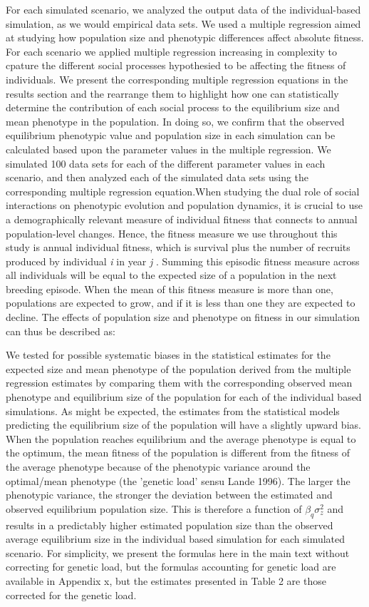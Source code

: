 \documentclass{article}
\begin{document}
For each simulated scenario, we analyzed the output data of the individual-based simulation, as we would empirical data sets. We used a multiple regression aimed at studying how population size and phenotypic differences affect absolute fitness. For each scenario we applied multiple regression increasing in complexity to cpature the different social processes hypothesied to be affecting the fitness of individuals. We present the corresponding multiple regression equations in the results section and the rearrange them to highlight how one can statistically determine the contribution of each social process to the equilibrium size and mean phenotype in the population. In doing so, we confirm that the observed equilibrium phenotypic value and population size in each simulation can be calculated based upon the parameter values in the multiple regression. We simulated 100 data sets for each of the different parameter values in each scenario, and then analyzed each of the simulated data sets using the corresponding multiple regression equation.When studying the dual role of social interactions on phenotypic evolution and population dynamics, it is crucial to use a demographically relevant measure of individual fitness that connects to annual population-level changes. Hence, the fitness measure we use throughout this study is annual individual fitness, which is survival plus the number of recruits produced by individual \textit{i} in year \textit{j}  \citep{Saether2015}. Summing this episodic fitness measure across all individuals will be equal to the expected size of a population in the next breeding episode. When the mean of this fitness measure is more than one, populations are expected to grow, and if it is less than one they are expected to decline. The effects of population size and phenotype on fitness in our simulation can thus be described as:


We tested for possible systematic biases in the statistical estimates for the expected size and mean phenotype of the population derived from the multiple regression estimates by comparing them with the corresponding observed mean phenotype and equilibrium size of the population for each of the individual based simulations. As might be expected, the estimates from the statistical models predicting the equilibrium size of the population will have a slightly upward bias\citep{Lande1996}. When the population reaches equilibrium and the average phenotype is equal to the optimum, the mean fitness of the population is different from the fitness of the average phenotype because of the phenotypic variance around the optimal/mean phenotype (the 'genetic load' sensu Lande 1996). The larger the phenotypic variance, the stronger the deviation between the estimated and observed equilibrium population size. This is therefore a function of $\beta_q \sigma^2_z$ and results in a predictably higher estimated population size than the observed average equilibrium size in the individual based simulation for each simulated scenario. For simplicity, we present the formulas here in the main text without correcting for genetic load, but the formulas accounting for genetic load are available in Appendix x, but the estimates presented in Table 2 are those corrected for the genetic load.   
\end{document}
